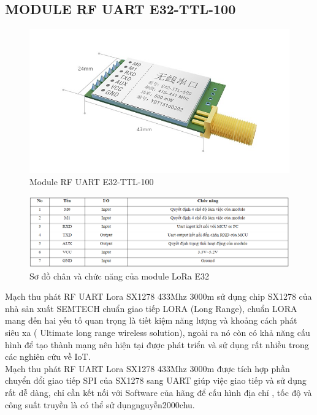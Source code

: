 \subsection{MODULE RF UART E32-TTL-100}
\begin{figure}[H]
	\centering
	\includegraphics[scale=.4]{Chapter 2/image chapter 2/E32.jpg}
	\caption[Module RF UART E32-TTL-100]{Module RF UART E32-TTL-100}
	\label{hinh35}
\end{figure}
\begin{figure}[H]
	\centering
	\includegraphics[scale=.5]{Chapter 2/image chapter 2/sodochanvachucnangE32.png}
	\caption[Sơ đồ chân và chức năng của module LoRa E32]{Sơ đồ chân và chức năng của module LoRa E32}
	\label{hinh36}
\end{figure}
Mạch thu phát RF UART Lora SX1278 433Mhz 3000m sử dụng chip SX1278 của nhà sản xuất SEMTECH chuẩn giao tiếp LORA (Long Range), chuẩn LORA mang đến hai yếu tố quan trọng là tiết kiệm năng lượng và khoảng cách phát siêu xa ( Ultimate long range wireless solution), ngoài ra nó còn có khả năng cấu hình để tạo thành mạng nên hiện tại được phát triển và sử dụng rất nhiều trong các nghiên cứu về IoT.\\
\indent Mạch thu phát RF UART Lora SX1278 433Mhz 3000m được tích hợp phần chuyển đổi giao tiếp SPI của SX1278 sang UART giúp việc giao tiếp và sử dụng rất dễ dàng, chỉ cần kết nối với Software của hãng để cấu hình địa chỉ , tốc độ và công suất truyền là có thể sử dụngnguyễn2000chu.\\
